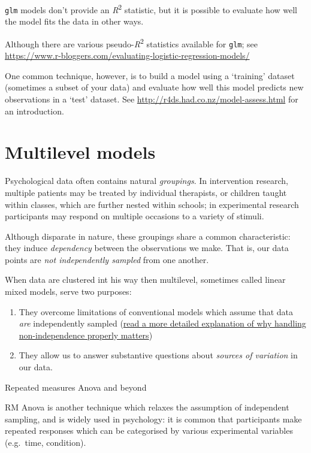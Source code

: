 \documentclass[]{article}
\theoremstyle{definition}
\theoremstyle{definition}
\theoremstyle{definition}
\theoremstyle{remark}
\begin{document}
\texttt{glm} models don't provide an \emph{R}\textsuperscript{2}
statistic, but it is possible to evaluate how well the model fits the
data in other ways.

{Although there are various pseudo-\emph{R}\textsuperscript{2}
statistics available for \texttt{glm}; see
\url{https://www.r-bloggers.com/evaluating-logistic-regression-models/}}

One common technique, however, is to build a model using a `training'
dataset (sometimes a subset of your data) and evaluate how well this
model predicts new observations in a `test' dataset. See
\url{http://r4ds.had.co.nz/model-assess.html} for an introduction.

\hypertarget{multilevel-models}{\section{Multilevel
models}\label{multilevel-models}}

Psychological data often contains natural \emph{groupings}. In
intervention research, multiple patients may be treated by individual
therapists, or children taught within classes, which are further nested
within schools; in experimental research participants may respond on
multiple occasions to a variety of stimuli.

Although disparate in nature, these groupings share a common
characteristic: they induce \emph{dependency} between the observations
we make. That is, our data points are \emph{not independently sampled}
from one another.

When data are clustered int his way then multilevel, sometimes called
linear mixed models, serve two purposes:

\begin{enumerate}
\def\labelenumi{\arabic{enumi}.}
\item
  They overcome limitations of conventional models which assume that
  data \emph{are} independently sampled
  (\protect\hyperlink{clustering}{read a more detailed explanation of
  why handling non-independence properly matters})
\item
  They allow us to answer substantive questions about \emph{sources of
  variation} in our data.
\end{enumerate}

Repeated measures Anova and beyond

RM Anova is another technique which relaxes the assumption of
independent sampling, and is widely used in psychology: it is common
that participants make repeated responses which can be categorised by
various experimental variables (e.g.~time, condition).
\end{document}
